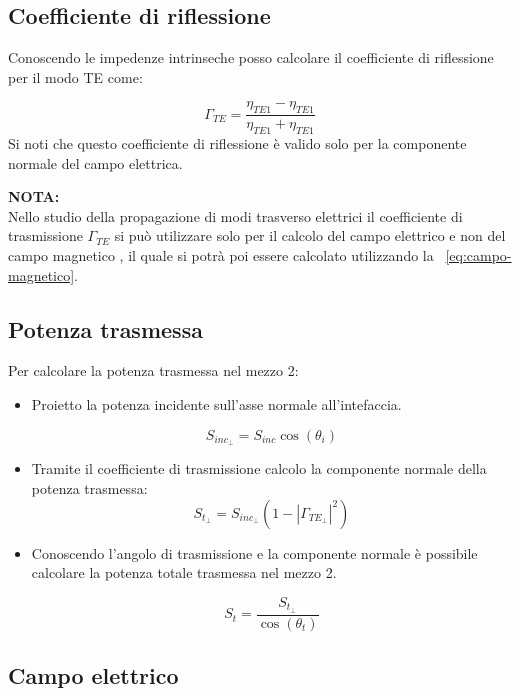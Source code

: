 \documentclass[10pt,a4paper]{report}
\begin{document}
		\subsection{Coefficiente di riflessione}
			Conoscendo le impedenze intrinseche posso calcolare il coefficiente di riflessione per il modo TE come:

			\[
			\Gamma_{TE}=\frac{\eta_{TE1}-\eta_{TE1}}{\eta_{TE1}+\eta_{TE1}}
			\]
			 Si noti che questo coefficiente di riflessione è valido solo per la componente normale del campo elettrica.

			 \textbf{NOTA:}
			 \\ 
			 Nello studio della propagazione di modi trasverso elettrici il coefficiente di trasmissione $\Gamma_{TE}$ si può utilizzare solo per il calcolo del campo elettrico e non del campo magnetico , il quale si potrà poi essere calcolato utilizzando la ~\ref{eq:campo-magnetico}.

		\subsection{Potenza trasmessa}

			Per calcolare la potenza trasmessa nel mezzo 2:
			\begin{itemize}
			\item Proietto la potenza incidente sull'asse normale all'intefaccia.

			\begin{equation}
			S_{inc_\perp}=S_{inc}\cos(\theta_i)
			\end{equation}

			\item Tramite il coefficiente di trasmissione calcolo la componente normale della potenza trasmessa:
			\begin{equation}
			S_{t_\perp}=S_{inc_\perp}(1-|\Gamma_{TE_\perp}|^2)
			\end{equation}

			\item Conoscendo l'angolo di trasmissione e la componente normale è possibile calcolare la potenza totale trasmessa nel mezzo 2.

			\begin{equation}
			S_{t}=\frac{S_{t_\perp}}{\cos(\theta_t)}
			\end{equation}
			\end{itemize}
		\subsection{Campo elettrico}
\end{document}
